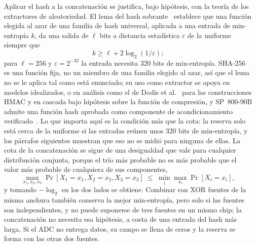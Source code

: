 Aplicar el hash a la concatenación se justifica, bajo hipótesis, con la
teoría de los extractores de aleatoriedad. El lema del hash
sobrante~\cite{impagliazzo_1989_pseudorandom} establece que una función
elegida al azar de una familia de hash universal, aplicada a una entrada
de min-entropía $k$, da una salida de $\ell$ bits a distancia estadística
$\varepsilon$ de la uniforme siempre que
\begin{equation}
k \geq \ell + 2\log_2(1/\varepsilon);
\label{eq:esp32_lhl}
\end{equation}
para $\ell = 256$ y $\varepsilon = 2^{-32}$ la entrada necesita 320 bits
de min-entropía. SHA-256 es una función fija, no un miembro de una familia
elegido al azar, así que el lema no se le aplica tal como está enunciado;
su uso como extractor se apoya en modelos idealizados, o en análisis como
el de Dodis et al.~\cite{dodis_2004_randomness} para las construcciones
HMAC y en cascada bajo hipótesis sobre la función de compresión, y
SP~800-90B admite una función hash aprobada como componente de
acondicionamiento verificado~\cite{turan_2018_sp80090b}. Lo que importa
aquí es la condición más que la cota: la reserva solo está cerca de la
uniforme si las entradas reúnen unos 320 bits de min-entropía, y los
párrafos siguientes muestran que eso no se midió para ninguna de ellas.
La cota de la concatenación se sigue de una desigualdad que vale para
cualquier distribución conjunta, porque el trío más probable no es más
probable que el valor más probable de cualquiera de sus componentes,
\begin{equation}
\max_{x_1,x_2,x_3}\Pr[X_1{=}x_1,X_2{=}x_2,X_3{=}x_3]
\;\leq\; \min_i \max_{x_i}\Pr[X_i{=}x_i],
\end{equation}
y tomando $-\log_2$ en los dos lados se obtiene. Combinar con XOR fuentes
de la misma anchura también conserva la mejor min-entropía, pero solo si
las fuentes son independientes, y no puede suponerse de tres fuentes en
un mismo chip; la concatenación no necesita esa hipótesis, a costa de una
entrada del hash más larga. Si el ADC no entrega datos, su campo se llena
de ceros y la reserva se forma con las otras dos fuentes.


